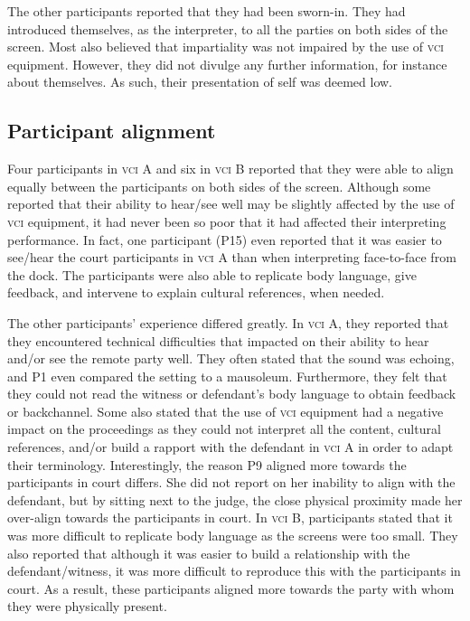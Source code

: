 \documentclass[output=paper]{langsci/langscibook}
\begin{document}
The other participants reported that they had been sworn-in. They had introduced themselves, as the interpreter, to all the parties on both sides of the screen. Most also believed that impartiality was not impaired by the use of \textsc{vci} equipment. However, they did not divulge any further information, for instance about themselves. As such, their presentation of self was deemed low.

\subsection{Participant alignment}
Four participants in \textsc{vci} A and six in \textsc{vci} B reported that they were able to align equally between the participants on both sides of the screen. Although some reported that their ability to hear/see well may be slightly affected by the use of \textsc{vci} equipment, it had never been so poor that it had affected their interpreting performance. In fact, one participant (P15) even reported that it was easier to see/hear the court participants in \textsc{vci} A than when interpreting face-to-face from the dock. The participants were also able to replicate body language, give feedback, and intervene to explain cultural references, when needed. 

The other participants’ experience differed greatly. In \textsc{vci} A, they reported that they encountered technical difficulties that impacted on their ability to hear and/or see the remote party well. They often stated that the sound was echoing, and P1 even compared the setting to a mausoleum. Furthermore, they felt that they could not read the witness or defendant’s body language to obtain feedback or backchannel. Some also stated that the use of \textsc{vci} equipment had a negative impact on the proceedings as they could not interpret all the content, cultural references, and/or build a rapport with the defendant in \textsc{vci} A in order to adapt their terminology. Interestingly, the reason P9 aligned more towards the participants in court differs. She did not report on her inability to align with the defendant, but by sitting next to the judge, the close physical proximity made her over-align towards the participants in court. In \textsc{vci} B, participants stated that it was more difficult to replicate body language as the screens were too small. They also reported that although it was easier to build a relationship with the defendant/witness, it was more difficult to reproduce this with the participants in court. As a result, these participants aligned more towards the party with whom they were physically present. 
\end{document}

